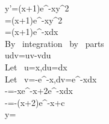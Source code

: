 y'=(x+1)e^{-x}y^2\\
=(x+1)e^{-x}y^2\\
\int {}=\int (x+1)e^{-x}dx\\
By \ integration \ by \ parts\\
\int udv=uv-\int vdu\\
Let \ u=x,du=dx\\
Let \ v=-e^{-x},dv=e^{-x}dx\\
-=-xe^{-x}+2\int e^{-x}dx\\
-=-(x+2)e^{-x}+c\\
y=